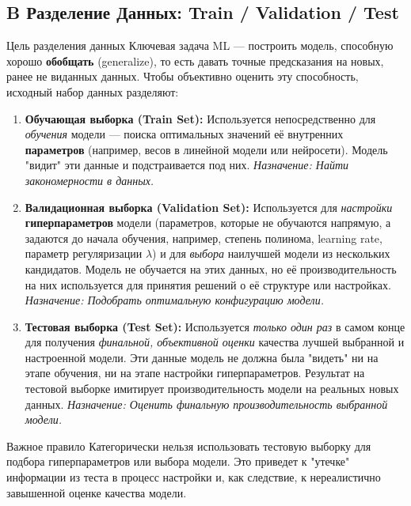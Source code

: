 \subsection{B Разделение Данных: Train / Validation / Test}
\begin{myexampleblock}{Цель разделения данных}
    Ключевая задача ML — построить модель, способную хорошо \textbf{обобщать} (generalize), то есть давать точные предсказания на новых, ранее не виданных данных. Чтобы объективно оценить эту способность, исходный набор данных разделяют:

    \begin{enumerate}[label=\arabic*., wide, labelindent=0pt, itemsep=1ex]
        \item \textbf{Обучающая выборка (Train Set):} \newline
        Используется непосредственно для \textit{обучения} модели — поиска оптимальных значений её внутренних \textbf{параметров} (например, весов в линейной модели или нейросети). Модель "видит" эти данные и подстраивается под них.
        \textit{Назначение: Найти закономерности в данных.}

        \item \textbf{Валидационная выборка (Validation Set):} \newline
        Используется для \textit{настройки} \textbf{гиперпараметров} модели (параметров, которые не обучаются напрямую, а задаются до начала обучения, например, степень полинома, learning rate, параметр регуляризации $\lambda$) и для \textit{выбора} наилучшей модели из нескольких кандидатов. Модель не обучается на этих данных, но её производительность на них используется для принятия решений о её структуре или настройках.
        \textit{Назначение: Подобрать оптимальную конфигурацию модели.}

        \item \textbf{Тестовая выборка (Test Set):} \newline
        Используется \textit{только один раз} в самом конце для получения \textit{финальной, объективной оценки} качества лучшей выбранной и настроенной модели. Эти данные модель не должна была "видеть" ни на этапе обучения, ни на этапе настройки гиперпараметров. Результат на тестовой выборке имитирует производительность модели на реальных новых данных.
        \textit{Назначение: Оценить финальную производительность выбранной модели.}
    \end{enumerate}

    \begin{alerttextbox}{Важное правило}
        Категорически нельзя использовать тестовую выборку для подбора гиперпараметров или выбора модели. Это приведет к "утечке" информации из теста в процесс настройки и, как следствие, к нереалистично завышенной оценке качества модели.
    \end{alerttextbox}
\end{myexampleblock}

